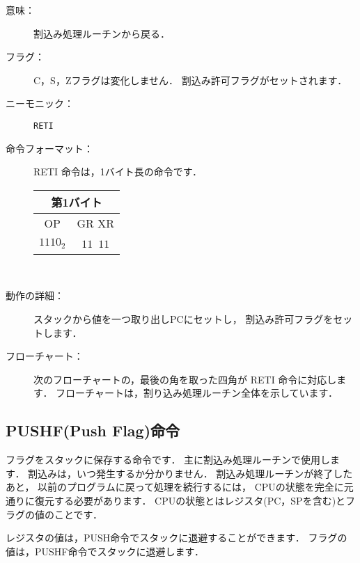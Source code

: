 \begin{description}
\item[意味：]割込み処理ルーチンから戻る．

\item[フラグ：]C，S，Zフラグは変化しません．
割込み許可フラグがセットされます．

\item[ニーモニック：] {\tt RETI}

\item[命令フォーマット：]RETI 命令は，1バイト長の命令です．

\begin{tabular}{|c|c|} \hline
\multicolumn{2}{|c|}{第1バイト} \\
\hline
OP & GR XR \\
\hline
$1110_2$ & $11$~$11$ \\
\hline
\end{tabular}\\

\item[動作の詳細：]スタックから値を一つ取り出しPCにセットし，
割込み許可フラグをセットします．

\item[フローチャート：]
次のフローチャートの，最後の角を取った四角が RETI 命令に対応します．
フローチャートは，割り込み処理ルーチン全体を示しています．

\begin{flushleft}
\epsfxsize=3cm
\end{flushleft}

\end{description}

\subsection{PUSHF(Push Flag)命令}

フラグをスタックに保存する命令です．
主に割込み処理ルーチンで使用します．
割込みは，いつ発生するか分かりません．
割込み処理ルーチンが終了したあと，
以前のプログラムに戻って処理を続行するには，
CPUの状態を完全に元通りに復元する必要があります．
CPUの状態とはレジスタ(PC，SPを含む)とフラグの値のことです．

レジスタの値は，PUSH命令でスタックに退避することができます．
フラグの値は，PUSHF命令でスタックに退避します．

